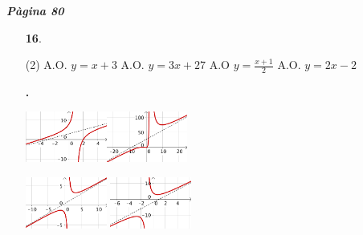 \documentclass[a4paper, pdf, twoside]{book}
\begin{document}
\begin{multicols}{2}

{\textbf{\em Pàgina 80}} \hrulefill
\begin{enumerate}
\vspace{0.25cm}



 \item[\fontfamily{phv}\selectfont\color{blue}\textbf{16}. ] 
 \begin{tasks}[column-sep=1em, item-indent=1.3333em](2)
	 \task A.O. $y=x+3$
	 \task A.O. $y=3x+27$
	 \task A.O $y=\frac {x+1}{2}$
	 \task A.O. $y=2x-2$
\end{tasks}
 \end{enumerate}
\begin{enumerate}
\vspace{0.25cm}
\item[\fontfamily{phv}\selectfont\color{blue}\textbf{. }] 
 \mbox {}\par \includegraphics [width=0.21\textwidth ]{img-sol/t6-16a}\includegraphics [width=0.21\textwidth ]{img-sol/t6-16b}\par \includegraphics [width=0.21\textwidth ]{img-sol/t6-16c} \includegraphics [width=0.21\textwidth ]{img-sol/t6-16d}
\vspace{0.25cm}




\end{enumerate}
\end{multicols}
\end{document}
